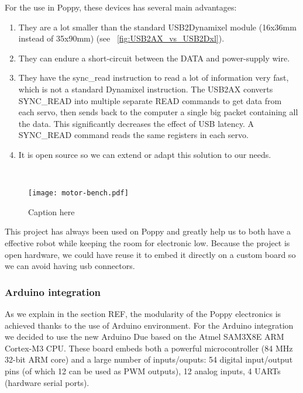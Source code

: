 For the use in Poppy, these devices has several main advantages:
\begin{enumerate}
    \item They are a lot smaller than the standard USB2Dynamixel module (16x36mm instead of 35x90mm) (see \figurename~\ref{fig:USB2AX_vs_USB2Dxl}).
    \item They can endure a short-circuit between the DATA and power-supply wire.
    \item They have the sync\_read instruction to read a lot of information very fast, which is not a standard Dynamixel instruction. The USB2AX converts SYNC\_READ into multiple separate READ commands to get data from each servo, then sends back to the computer a single big packet containing all the data. This significantly decreases the effect of USB latency. A SYNC\_READ command reads the same registers in each servo.
    \item It is open source so we can extend or adapt this solution to our needs.
\end{enumerate}

\begin{figure}[tb]
\centering
    \hfil
    \\
    \caption{}
    \label{fig:usb2ax}
\end{figure}

\begin{figure}[tb]
    \begin{center}
        \texttt{[image: motor-bench.pdf]}
    \end{center}
    \caption{Caption here}
    \label{fig:figure1}
\end{figure}

This project has always been used on Poppy and greatly help us to both have a effective robot while keeping the room for electronic low.
Because the project is open hardware, we could have reuse it to embed it directly on a custom board so we can avoid having usb connectors.

\subsubsection{Arduino integration} %
As we explain in the section REF, the modularity of the Poppy electronics is achieved thanks to the use of Arduino environment. For the Arduino integration we decided to use the new Arduino Due based on the Atmel SAM3X8E ARM Cortex-M3 CPU. These board embeds both a powerful microcontroller (84 MHz 32-bit ARM core) and a large number of inputs/ouputs: 54 digital input/output pins (of which 12 can be used as PWM outputs), 12 analog inputs, 4 UARTs (hardware serial ports).



